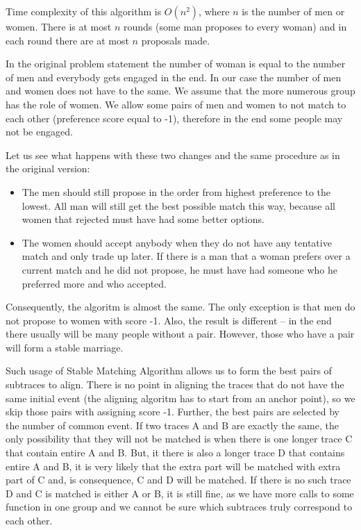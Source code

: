 Time complexity of this algorithm is $O(n^2)$, where $n$ is the number of men or women.
There is at most $n$ rounds (some man proposes to every woman) and in each round
there are at most $n$ proposals made.

In the original problem statement the number of woman is equal to the number of men
and everybody gets engaged in the end.
In our case the number of men and women does not have to the same. We assume that
the more numerous group has the role of women. 
We allow some pairs of men and women to not match to each other (preference score equal to -1),
therefore in the end some people may not be engaged.

Let us see what happens with these two changes and the same procedure as in the original version:
\begin{itemize}
  \item The men should still propose in the order from highest preference to the lowest. 
  			All man will still get the best possible match this way, 
  			because all women that rejected must have had some better options.
  \item The women should accept anybody when they do not have any tentative match and
           only trade up later. If there is a man that a woman prefers over a current match and he did not
           propose, he must have had someone who he preferred more and who accepted.
\end{itemize}

Consequently, the algoritm is almost the same. The only exception is that men do not propose to women with score -1.
Also, the result is different -- in the end there usually will be many people without a pair. 
However, those who have a pair will form a stable marriage.

Such usage of Stable Matching Algorithm allows us to form the best pairs of subtraces to align.
There is no point in aligning the traces that do not have the same initial event (the aligning algoritm has to
start from an anchor point), so we skip those pairs with assigning score -1. Further, the best pairs are
selected by the number of common event. If two traces A and B are exactly the same, the only possibility that they will
not be matched is when there is one longer trace C that contain entire A and B. But, it there is also a longer trace D
that contains entire A and B, it is very likely that the extra part will be matched with extra part of C and,
is consequence, C and D will be matched. If there is no such trace D and C is matched is either A or B, it is still
fine, as we have more calls to some function in one group and we cannot be sure which subtraces truly
correspond to each other.


